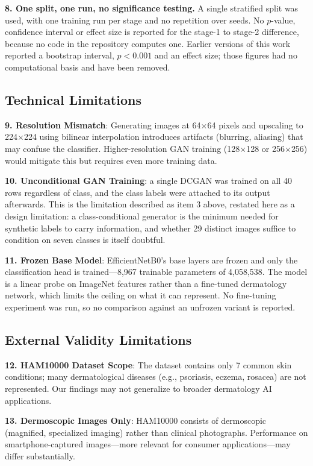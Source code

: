 \documentclass[ai,article,submit,pdftex,moreauthors]{Definitions/mdpi}
\begin{document}
\textbf{8. One split, one run, no significance testing.} A single stratified split was used, with one training run per stage and no repetition over seeds. No $p$-value, confidence interval or effect size is reported for the stage-1 to stage-2 difference, because no code in the repository computes one. Earlier versions of this work reported a bootstrap interval, $p < 0.001$ and an effect size; those figures had no computational basis and have been removed.

\subsection{Technical Limitations}

\textbf{9. Resolution Mismatch}: Generating images at 64$\times$64 pixels and upscaling to 224$\times$224 using bilinear interpolation introduces artifacts (blurring, aliasing) that may confuse the classifier. Higher-resolution GAN training (128$\times$128 or 256$\times$256) would mitigate this but requires even more training data.

\textbf{10. Unconditional GAN Training}: a single DCGAN was trained on all 40 rows regardless of class, and the class labels were attached to its output afterwards. This is the limitation described as item 3 above, restated here as a design limitation: a class-conditional generator is the minimum needed for synthetic labels to carry information, and whether 29 distinct images suffice to condition on seven classes is itself doubtful.

\textbf{11. Frozen Base Model}: EfficientNetB0's base layers are frozen and only the classification head is trained---8,967 trainable parameters of 4,058,538. The model is a linear probe on ImageNet features rather than a fine-tuned dermatology network, which limits the ceiling on what it can represent. No fine-tuning experiment was run, so no comparison against an unfrozen variant is reported.

\subsection{External Validity Limitations}

\textbf{12. HAM10000 Dataset Scope}: The dataset contains only 7 common skin conditions; many dermatological diseases (e.g., psoriasis, eczema, rosacea) are not represented. Our findings may not generalize to broader dermatology AI applications.

\textbf{13. Dermoscopic Images Only}: HAM10000 consists of dermoscopic (magnified, specialized imaging) rather than clinical photographs. Performance on smartphone-captured images---more relevant for consumer applications---may differ substantially.
\end{document}
